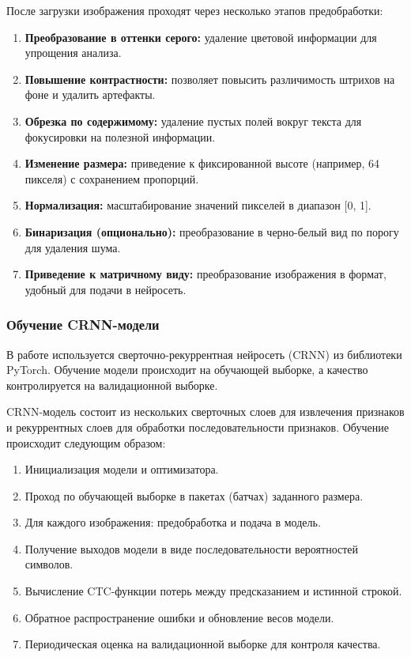 \documentclass[12pt,a4paper]{article}
\begin{document}
После загрузки изображения проходят через несколько этапов предобработки:

\begin{enumerate}
    \item \textbf{Преобразование в оттенки серого:} удаление цветовой информации для упрощения анализа.
    \item \textbf{Повышение контрастности:} позволяет повысить различимость штрихов на фоне и удалить артефакты.
    \item \textbf{Обрезка по содержимому:} удаление пустых полей вокруг текста для фокусировки на полезной информации.
    \item \textbf{Изменение размера:} приведение к фиксированной высоте (например, 64 пикселя) с сохранением пропорций.
    \item \textbf{Нормализация:} масштабирование значений пикселей в диапазон [0, 1].
    \item \textbf{Бинаризация (опционально):} преобразование в черно-белый вид по порогу для удаления шума.
    \item \textbf{Приведение к матричному виду:} преобразование изображения в формат, удобный для подачи в нейросеть.
\end{enumerate}

\subsubsection{Обучение CRNN-модели}

В работе используется сверточно-рекуррентная нейросеть (CRNN) из библиотеки PyTorch. Обучение модели происходит на обучающей выборке, а качество контролируется на валидационной выборке.

CRNN-модель состоит из нескольких сверточных слоев для извлечения признаков и рекуррентных слоев для обработки последовательности признаков. Обучение происходит следующим образом:
\begin{enumerate}
    \item Инициализация модели и оптимизатора.
    \item Проход по обучающей выборке в пакетах (батчах) заданного размера.
    \item Для каждого изображения: предобработка и подача в модель.
    \item Получение выходов модели в виде последовательности вероятностей символов.
    \item Вычисление CTC-функции потерь между предсказанием и истинной строкой.
    \item Обратное распространение ошибки и обновление весов модели.
    \item Периодическая оценка на валидационной выборке для контроля качества.
\end{enumerate}
\end{document}
